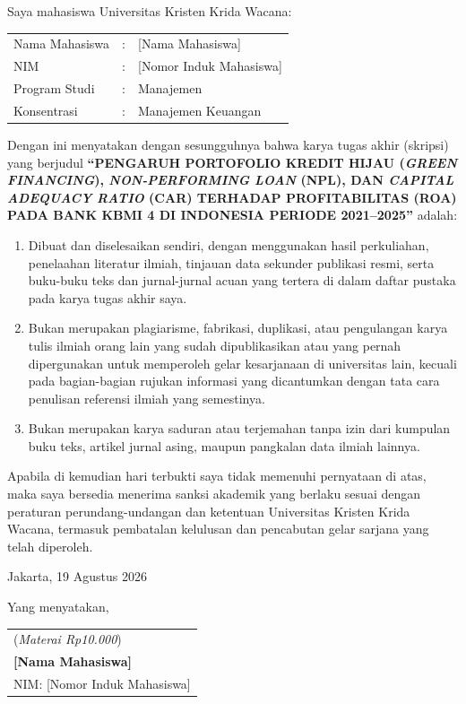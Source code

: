 \documentclass[12pt,a4paper]{article}
\newcommand{\ukrida}{Universitas Kristen Krida Wacana}
\newcommand{\prodi}{Manajemen}
\newcommand{\nahamahasiswa}{[Nama Mahasiswa]}
\newcommand{\nim}{[Nomor Induk Mahasiswa]}
\newcommand{\judulkapital}{PENGARUH PORTOFOLIO KREDIT HIJAU (\emph{GREEN FINANCING}), \emph{NON-PERFORMING LOAN} (NPL), DAN \emph{CAPITAL ADEQUACY RATIO} (CAR) TERHADAP PROFITABILITAS (ROA) PADA BANK KBMI 4 DI INDONESIA PERIODE 2021--2025}
\numberwithin{equation}{section}
\begin{document}
\vspace{0.8cm}
\noindent Saya mahasiswa \ukrida:

\vspace{0.5cm}
\noindent
\begin{tabular}{lll}
  Nama Mahasiswa & : & \nahamahasiswa \\
  NIM            & : & \nim \\
  Program Studi  & : & \prodi \\
  Konsentrasi    & : & Manajemen Keuangan \\
\end{tabular}

\vspace{0.8cm}
\noindent
Dengan ini menyatakan dengan sesungguhnya bahwa karya tugas akhir (skripsi) yang berjudul \textbf{``\judulkapital''} adalah:

\begin{enumerate}
  \item Dibuat dan diselesaikan sendiri, dengan menggunakan hasil perkuliahan, penelaahan literatur ilmiah, tinjauan data sekunder publikasi resmi, serta buku-buku teks dan jurnal-jurnal acuan yang tertera di dalam daftar pustaka pada karya tugas akhir saya.
  \item Bukan merupakan plagiarisme, fabrikasi, duplikasi, atau pengulangan karya tulis ilmiah orang lain yang sudah dipublikasikan atau yang pernah dipergunakan untuk memperoleh gelar kesarjanaan di universitas lain, kecuali pada bagian-bagian rujukan informasi yang dicantumkan dengan tata cara penulisan referensi ilmiah yang semestinya.
  \item Bukan merupakan karya saduran atau terjemahan tanpa izin dari kumpulan buku teks, artikel jurnal asing, maupun pangkalan data ilmiah lainnya.
\end{enumerate}

\noindent
Apabila di kemudian hari terbukti saya tidak memenuhi pernyataan di atas, maka saya bersedia menerima sanksi akademik yang berlaku sesuai dengan peraturan perundang-undangan dan ketentuan \ukrida, termasuk pembatalan kelulusan dan pencabutan gelar sarjana yang telah diperoleh.

\vspace{1.2cm}
\noindent Jakarta, 19 Agustus 2026

\vspace{0.3cm}
\noindent Yang menyatakan,

\vspace{2.2cm}
\noindent
\begin{tabular}{l}
  (\emph{Materai Rp10.000}) \\[0.2cm]
  \textbf{\nahamahasiswa} \\
  NIM: \nim
\end{tabular}
\end{document}
